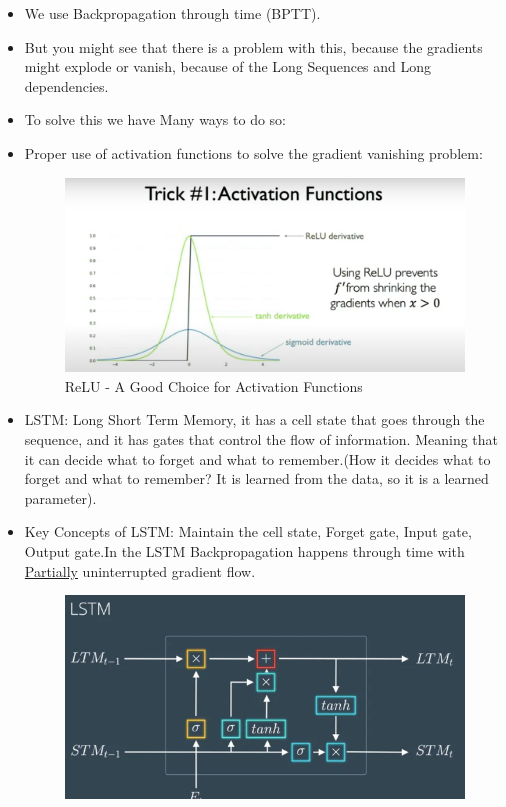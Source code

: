 \documentclass{article}
\begin{document}
  \begin{itemize}
    \item We use Backpropagation through time (BPTT).
    \item But you might see that there is a problem with this, because the gradients might explode or vanish, because of the Long Sequences and Long dependencies.
    \item To solve this we have Many ways to do so:
    \item Proper use of activation functions to solve the gradient vanishing problem: 
    \begin{figure}[H]
      \centering
      \includegraphics[width = \textwidth]{Images/rnn7.png}
      \caption{ReLU - A Good Choice for Activation Functions}
    \end{figure}
    \item LSTM: Long Short Term Memory, it has a cell state that goes through the sequence, and it has gates that control the flow of information. Meaning that it can decide what to forget and what to remember.(How it decides what to forget and what to remember? It is learned from the data, so it is a learned parameter).
    \item Key Concepts of LSTM: Maintain the cell state, Forget gate, Input gate, Output gate.In the LSTM Backpropagation happens through time with \underline{Partially} uninterrupted gradient flow.
    \begin{figure}[H]
      \centering
      \includegraphics[width = \textwidth]{Images/lstm.png}

\end{figure}
\end{itemize}
\end{document}
